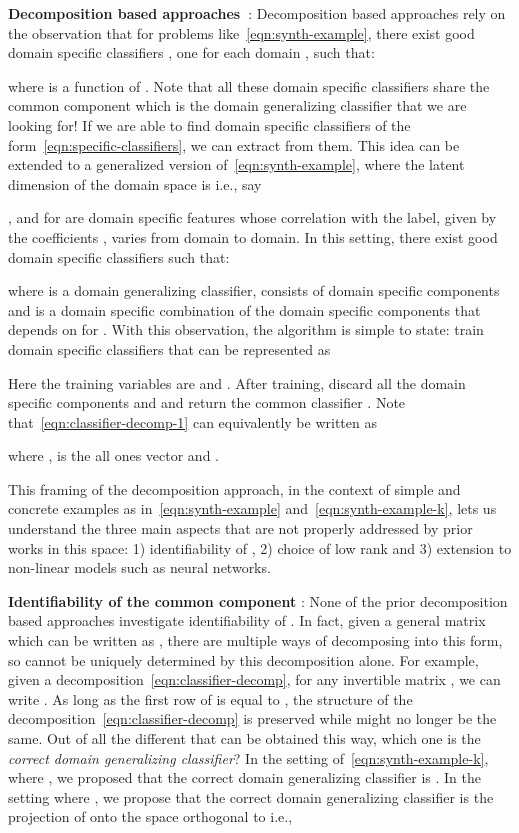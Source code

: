 \documentclass{article}
\begin{document}
\textbf{Decomposition based approaches~\cite{ECCV12_Khosla,LiYSH17}}: Decomposition based approaches rely on the observation that for problems like~\eqref{eqn:synth-example}, there exist good domain specific classifiers , one for each domain , such that:

where  is a function of . Note that all these domain specific classifiers share the common component  which is the domain generalizing classifier that we are looking for! If we are able to find domain specific classifiers of the form~\eqref{eqn:specific-classifiers}, we can extract  from them. This idea can be extended to a generalized version of~\eqref{eqn:synth-example}, where the latent dimension of the domain space is  i.e., say

, {and  for } are domain specific features whose correlation with the label, given by the coefficients , varies from domain to domain. In this setting, there exist good domain specific classifiers  such that:

where  is a domain generalizing classifier,  consists of domain specific components
and  is a domain specific combination of the domain specific components that depends on  for . With this observation, the algorithm is simple to state: train domain specific classifiers  that can be represented as

Here the training variables are  and . After training, discard all the domain specific components  and  and return the common classifier .
Note that~\eqref{eqn:classifier-decomp-1} can equivalently be written as

where ,  is the all ones vector and .

This framing of the decomposition approach, in the context of simple and concrete examples as in~\eqref{eqn:synth-example} and~\eqref{eqn:synth-example-k}, lets us understand the three main aspects that are not properly addressed by prior works in this space: 1) identifiability of , 2) choice of low rank and 3) extension to non-linear models such as neural networks.


\textbf{Identifiability of the common component }: None of the prior decomposition based approaches investigate identifiability of . In fact, given a general matrix  which can be written as , there are multiple ways of decomposing  into this form, so  cannot be uniquely determined by this decomposition alone. For example, given a decomposition~\eqref{eqn:classifier-decomp}, for any  invertible matrix , we can write . As long as the first row of  is equal to , the structure of the decomposition~\eqref{eqn:classifier-decomp} is preserved while  might no longer be the same. Out of all the different  that can be obtained this way, which one is the \emph{correct domain generalizing classifier}? In the setting of~\eqref{eqn:synth-example-k}, where , we proposed that the correct domain generalizing classifier is . In the setting where , we propose that
the correct domain generalizing classifier is the projection of  onto the space orthogonal to  i.e.,
\end{document}
